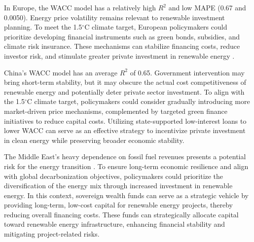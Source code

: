 In Europe, the WACC model has a relatively high $R^2$ and low MAPE (0.67 and 0.0050). Energy price volatility remains relevant to renewable investment planning. To meet the 1.5$^\circ$C climate target, European policymakers could prioritize developing financial instruments such as green bonds, subsidies, and climate risk insurance. These mechanisms can stabilize financing costs, reduce investor risk, and stimulate greater private investment in renewable energy \cite{POLZIN20191249}.

China's WACC model has an average $R^2$ of 0.65. Government intervention may bring short-term stability, but it may obscure the actual cost competitiveness of renewable energy and potentially deter private sector investment. To align with the 1.5$^\circ$C climate target, policymakers could consider gradually introducing more market-driven price mechanisms, complemented by targeted green finance initiatives to reduce capital costs. Utilizing state-supported low-interest loans to lower WACC can serve as an effective strategy to incentivize private investment in clean energy while preserving broader economic stability.

The Middle East's heavy dependence on fossil fuel revenues presents a potential risk for the energy transition \cite{karanfil2023energy}. To ensure long-term economic resilience and align with global decarbonization objectives, policymakers could prioritize the diversification of the energy mix through increased investment in renewable energy. In this context, sovereign wealth funds can serve as a strategic vehicle by providing long-term, low-cost capital for renewable energy projects, thereby reducing overall financing costs. These funds can strategically allocate capital toward renewable energy infrastructure, enhancing financial stability and mitigating project-related risks.
